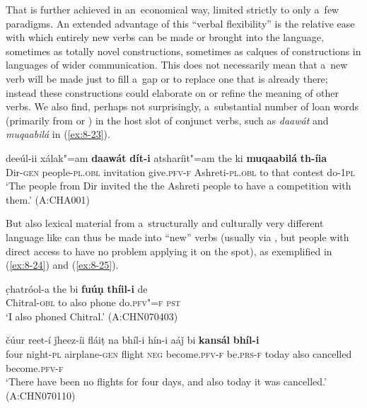 \begin{exe}
That is further achieved in an~economical way, limited strictly to only a~few  paradigms. An extended advantage of this ``verbal flexibility'' is the relative ease with which entirely new verbs can be made or brought into the language, sometimes as totally novel constructions, sometimes as calques of  constructions in languages of wider communication. This does not necessarily mean that a~new verb will be made just to fill a~gap or to replace one that is already there; instead these constructions could elaborate on or refine the meaning of other verbs. We also find, perhaps not surprisingly, a~substantial number of loan words (primarily from \iliUrdu or \iliPashto) in the host slot of conjunct verbs, such as \textit{daawát} and \textit{muqaabilá} in (\ref{ex:8-23}).

\ea
\label{ex:8-23}
\gll deeúl-ii xálak"=am \textbf{daawát} \textbf{dít-i} atsharíit"=am the ki \textbf{muqaabilá} \textbf{th-íia}\\
Dir-\textsc{gen} people-\textsc{pl.obl} invitation give.\textsc{pfv-f} Ashreti-\textsc{pl.obl} to that contest do-\textsc{1pl}\\
\glt `The people from Dir invited the the Ashreti people to have a competition with them.' (A:CHA001)
\z

But also lexical material from a~structurally and culturally very different language like \iliEnglish can thus be made into ``new'' verbs (usually via \iliUrdu, but people with direct access to \iliEnglish have no problem applying it on the spot), as exemplified in (\ref{ex:8-24}) and (\ref{ex:8-25}).

\begin{exe}
\ex
\label{ex:8-24}
\gll c̣hatróol-a the bi \textbf{fuúṇ} \textbf{thíil-i} de\\
Chitral-\textsc{obl} to also phone do.\textsc{pfv"=f} \textsc{pst}\\
\glt `I also phoned Chitral.' (A:CHN070403)
\end{exe}
\begin{exe}
\ex
\label{ex:8-25}
\gll čúur reet-í ǰheez-íi fláiṭ na bhíl-i  hín-i aáǰ bi \textbf{kansál} \textbf{bhíl-i}\\
four night-\textsc{pl} airplane-\textsc{gen} flight \textsc{neg} become.\textsc{pfv-f}  be.\textsc{prs-f} today also cancelled become.\textsc{pfv-f}\\
\glt `There have been no flights for four days, and also today it was cancelled.' (A:CHN070110)
\end{exe}


\end{exe}
